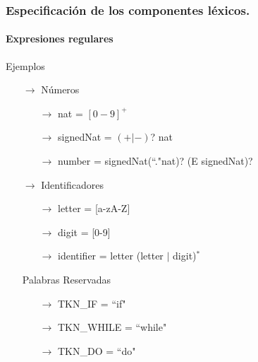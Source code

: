 \documentclass{beamer}
\begin{document}
		\begin{frame}
			\frametitle{Especificaci\'on de los componentes l\'exicos.}
			\framesubtitle{Expresiones regulares}

            \begin{exampleblock}{Ejemplos}
			   \begin{itemize}
			       \item[$\rightarrow$] N\'umeros
			       \begin{itemize}
			           \item[$\rightarrow$] nat = $[0-9]^{+}$
			           \item[$\rightarrow$] signedNat = $( + | - )$? nat
			           \item[$\rightarrow$] number = signedNat(``."nat)? (E signedNat)?
			       \end{itemize}
			       \item[$\rightarrow$] Identificadores
			       \begin{itemize}
			           \item[$\rightarrow$] letter = [a-zA-Z]
			           \item[$\rightarrow$] digit = [0-9]
			           \item[$\rightarrow$] identifier = letter (letter $|$ digit)$^*$
			       \end{itemize}
			       \item[] Palabras Reservadas
			       \begin{itemize}
			           \item[$\rightarrow$] TKN\_IF = ``if"
			           \item[$\rightarrow$] TKN\_WHILE = ``while"
			           \item[$\rightarrow$] TKN\_DO = ``do"			       
			       \end{itemize}
			   \end{itemize}
			\end{exampleblock}
		\end{frame}		
\end{document}
